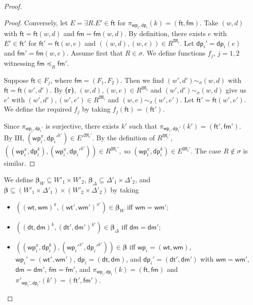 \documentclass{lmcs} %
\theoremstyle{plain}\newtheorem{satz}[thm]{Satz} %
\newcommand{\wt}{\mathsf{wt}}
\newcommand{\dt}{\mathsf{dt}}
\newcommand{\ft}{\mathsf{ft}}
\newcommand{\wm}{\mathsf{wm}}
\newcommand{\dm}{\mathsf{dm}}
\newcommand{\iwp}{\mathsf{wp}_i}
\newcommand{\idp}{\mathsf{dp}_i}
\newcommand{\pet}{\ft}
\newcommand{\pam}{\mathsf{fm}}
\newcommand{\et}{\ft}
\newcommand{\bs}{\boldsymbol{\beta}}
\begin{document}
\begin{proof}
\begin{proof}
Conversely, let $E=\exists R.E' \in \pet$ for $\pi_{\iwp,\idp}(k)=
(\pet,\pam)$. Take $(w,d)$ with $\pet=\pet(w,d)$ and $\pam=\pam(w,d)$. By definition, there exists $e$ with $E'\in \pet'$ for
$\pet'=\pet(w,e)$ and $((w,d),(w,e))\in R^{\mathfrak{M}_{i}}$. Let $\idp'=\idp(e)$ and $\pam'=\pam(w,e)$. 
%
Assume first that $R\in \sigma$.
We define functions $f_{j}$, $j=1,2$ witnessing $\pam \preceq_{R} \pam'$. 

Suppose $\et \in F_{j}$, where $\pam=(F_{1},F_{2})$.  
Then we find $(w',d')\sim_{\sigma} (w,d)$ with  
$\et = \pet(w',d')$. 
%
By {\bf (r)}, $(w,d),(w,e) \in R^{\mathfrak{M}_{i}}$ and $(w',d')\sim_{\sigma} (w,d)$ give us $e'$ with $(w',d'),(w',e') \in R^{\mathfrak{M}_{i}}$ and $(w,e)\sim_{\sigma} (w',e')$. Let $\et'= \pet(w',e')$. We define the required $f_{j}$ by taking $f_{j}(\et)=(\et')$.
%

Since $\pi_{\iwp,\idp'}$ is surjective, there exists 
$k'$ such that $\pi_{\iwp,\idp'}(k')=(\pet',\pam')$.
By IH, $(\iwp^\pi,\idp'^{k'}) \in E'^{\mathfrak{M}_{i}'}$. By the definition of $R^{\mathfrak{M}_{i}'}$,
%
$
((\iwp^\pi,\idp^k),(\iwp^\pi,\idp'^{k'})) \in R^{\mathfrak{M}_{i}'},
$
%
so $(\iwp^\pi,\idp^k)\in E^{\mathfrak{M}_{i}'}$.
%
The case $R\not\in\sigma$ is similar. 
\end{proof}

We define $\bs_W \subseteq W'_1 \times W'_2$, $\bs_\Delta \subseteq \Delta'_1 \times \Delta'_2$, and $\bs \subseteq (W'_{1}\times \Delta'_{1}) \times (W'_{2} \times \Delta'_{2})$ by taking  
%
\begin{itemize}
\item[--] $((\wt,\wm)^{\pi},(\wt',\wm')^{\pi'})\in \bs_{W}$ iff $\wm=\wm'$;

\item[--] $((\dt,\dm)^{k},(\dt',\dm')^{k'}) \in \bs_{\Delta}$ iff $\dm=\dm'$;

\item[--] $((\iwp^{\pi}, \idp^{k}),({\iwp'}^{\pi'},{\idp'}^{k'}))\in \bs$ iff $\iwp= (\wt,\wm)$, $\iwp'=(\wt',\wm')$, $\idp=(\dt,\dm)$, and $\idp'=(\dt',\dm')$ with $\wm=\wm'$, $\dm=\dm'$, $\pam=\pam'$, and $\pi_{\iwp,\idp}(k) = (\pet,\pam)$ and $\pi'_{\iwp',\idp'}(k') = (\pet',\pam')$. 
\end{itemize}
%	


\end{proof}
\end{document}
